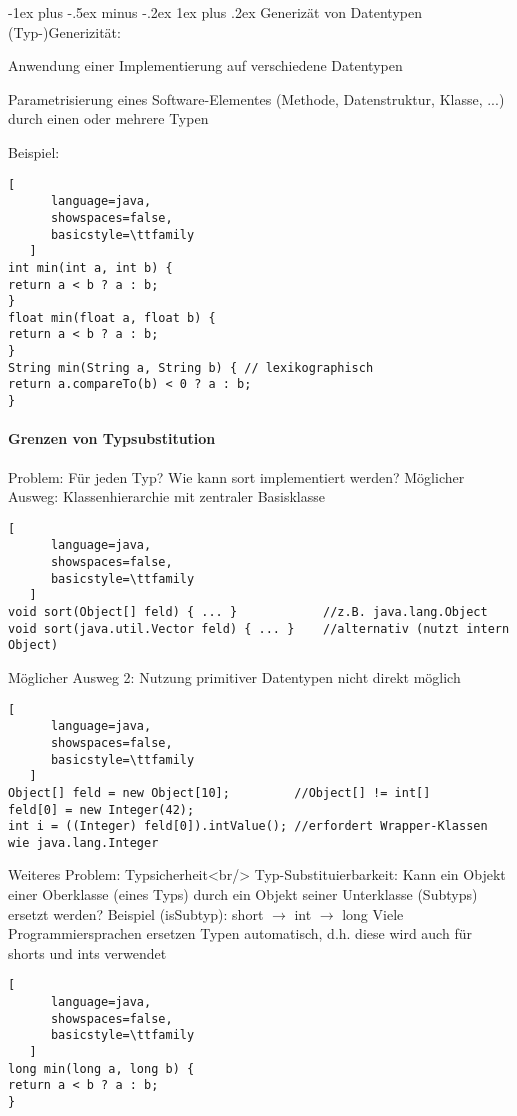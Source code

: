 \documentclass[10pt]{article}
\makeatletter
\renewcommand{\subsubsection}{\@startsection{subsubsection}{3}{0mm}%
                                {-1ex plus -.5ex minus -.2ex}%
                                {1ex plus .2ex}%
                                {\normalfont\small\bfseries}}
\makeatother
\begin{document}
\subsubsection{Generizät von Datentypen}
(Typ-)Generizität: 
\begin{itemize*}
  \item Anwendung einer Implementierung auf verschiedene Datentypen
  \item Parametrisierung eines Software-Elementes (Methode, Datenstruktur, Klasse, ...) durch einen oder mehrere Typen
\end{itemize*}
Beispiel:
\begin{lstlisting}[
      language=java,
      showspaces=false,
      basicstyle=\ttfamily
   ]
int min(int a, int b) {
return a < b ? a : b;
}
float min(float a, float b) {
return a < b ? a : b;
}
String min(String a, String b) { // lexikographisch
return a.compareTo(b) < 0 ? a : b;
}
\end{lstlisting}


\paragraph{Grenzen von Typsubstitution}
Problem: Für jeden Typ? Wie kann sort implementiert werden?
Möglicher Ausweg: Klassenhierarchie mit zentraler Basisklasse
\begin{lstlisting}[
      language=java,
      showspaces=false,
      basicstyle=\ttfamily
   ]
void sort(Object[] feld) { ... }            //z.B. java.lang.Object
void sort(java.util.Vector feld) { ... }    //alternativ (nutzt intern Object)
\end{lstlisting}

Möglicher Ausweg 2: Nutzung primitiver Datentypen nicht direkt möglich
\begin{lstlisting}[
      language=java,
      showspaces=false,
      basicstyle=\ttfamily
   ]
Object[] feld = new Object[10];         //Object[] != int[]
feld[0] = new Integer(42);
int i = ((Integer) feld[0]).intValue(); //erfordert Wrapper-Klassen wie java.lang.Integer
\end{lstlisting}


Weiteres Problem: Typsicherheit<br/>
Typ-Substituierbarkeit: Kann ein Objekt einer Oberklasse (eines Typs) durch ein Objekt seiner Unterklasse (Subtyps) ersetzt werden?
Beispiel (isSubtyp): short $\rightarrow$ int $\rightarrow$ long 
Viele Programmiersprachen ersetzen Typen automatisch, d.h. diese wird auch für shorts und ints verwendet
\begin{lstlisting}[
      language=java,
      showspaces=false,
      basicstyle=\ttfamily
   ]
long min(long a, long b) {
return a < b ? a : b;
}
\end{lstlisting}
\end{document}
